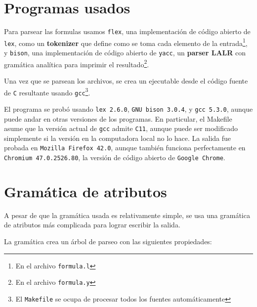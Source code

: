 \documentclass[a4paper, 10pt, twoside]{article}
\begin{document}
\newpage

\section{Programas usados}

Para parsear las formulas usamos \texttt{flex}, una implementaci\'on de c\'odigo abierto de \texttt{lex}, como un \textbf{tokenizer} que define como se toma cada elemento de la entrada\footnote{En el archivo \texttt{formula.l}}, y \texttt{bison}, una implementaci\'on de c\'odigo abierto de \texttt{yacc}, un \textbf{parser LALR} con gram\'atica anal\'itica para imprimir el resultado\footnote{En el archivo \texttt{formula.y}}.

Una vez que se parsean los archivos, se crea un ejecutable desde el c\'odigo fuente de \texttt{C} resultante usando \texttt{gcc}\footnote{El \texttt{Makefile} se ocupa de procesar todos los fuentes autom\'aticamente}.

El programa se prob\'o usando \texttt{lex 2.6.0}, \texttt{GNU bison 3.0.4}, y \texttt{gcc 5.3.0}, aunque puede andar en otras versiones de los programas. En particular, el Makefile asume que la versi\'on actual de \texttt{gcc} admite \texttt{C11}, aunque puede ser modificado simplemente si la versi\'on en la computadora local no lo hace. La salida fue probada en \texttt{Mozilla Firefox 42.0}, aunque tambi\'en funciona perfectamente en \texttt{Chromium 47.0.2526.80}, la versi\'on de c\'odigo abierto de \texttt{Google Chrome}.

\section{Gram\'atica de atributos}

A pesar de que la gram\'atica usada es relativamente simple, se usa una gram\'atica de atributos m\'as complicada para lograr escribir la salida.

La gram\'atica crea un \'arbol de parseo con las siguientes propiedades:
\end{document}

